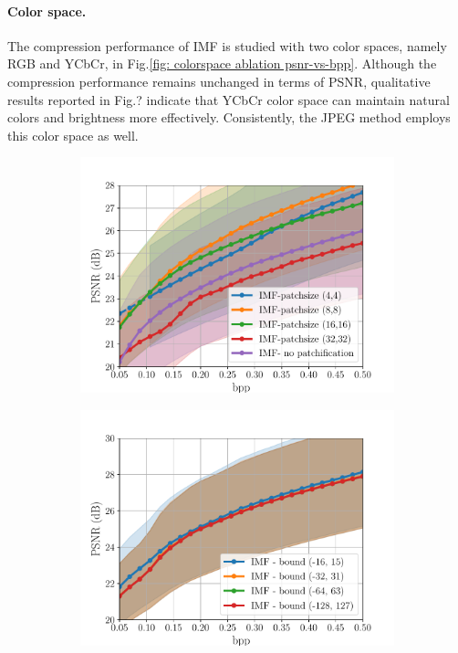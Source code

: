 \paragraph{Color space.}
The compression performance of IMF is studied with two color spaces, namely RGB and YCbCr, in Fig.\ref{fig: colorspace ablation psnr-vs-bpp}.
Although the compression performance remains unchanged in terms of PSNR, qualitative results reported in Fig.? indicate that YCbCr color space can maintain natural colors and brightness more effectively. Consistently, the JPEG method employs this color space as well.

\begin{figure}[t]
	\centering
	\begin{subfigure}{.5\textwidth}
		\centering
		\includegraphics[width=.95\textwidth]{figures/ablation_patchsize_psnr.pdf}
		\caption{}
		\label{fig: patch ablation psnr-vs-bpp}
	\end{subfigure}%
	\begin{subfigure}{.5\textwidth}
		\centering
		\includegraphics[width=.95\textwidth]{figures/ablation_bounds_psnr.pdf}
		\caption{}
		\label{fig: bounds ablation psnr-vs-bpp}
	\end{subfigure}
	

\end{figure}
